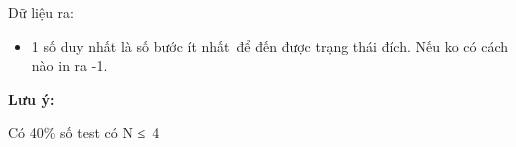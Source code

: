 Dữ liệu ra:
\begin{itemize}
	\item     1 số duy nhất là số bước ít nhất để đến được trạng thái đích. Nếu ko có cách nào in ra -1.   
\end{itemize}

\textbf{     Lưu ý:    }

    Có 40\% số test có N ≤ 4
